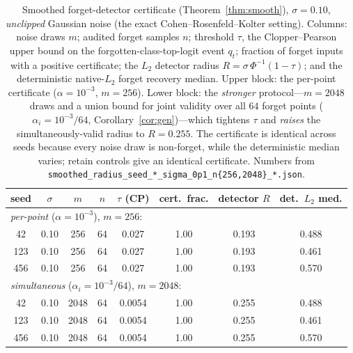 \documentclass[11pt]{article}
\begin{document}
\begin{table}[t]
  \centering
  \small
  \setlength{\tabcolsep}{5pt}
  \begin{tabular}{c c c c c c c c}
    \toprule
    seed & $\sigma$ & $m$ & $n$ & $\tau$ (CP) & cert.\ frac. & detector $R$ & det.\ $L_2$ med. \\
    \midrule
    \multicolumn{8}{l}{\emph{per-point} ($\alpha = 10^{-3}$), $m=256$:} \\
    42  & 0.10 & 256 & 64 & 0.027 & 1.00 & 0.193 & 0.488 \\
    123 & 0.10 & 256 & 64 & 0.027 & 1.00 & 0.193 & 0.461 \\
    456 & 0.10 & 256 & 64 & 0.027 & 1.00 & 0.193 & 0.570 \\
    \midrule
    \multicolumn{8}{l}{\emph{simultaneous} ($\alpha_i = 10^{-3}/64$), $m=2048$:} \\
    42  & 0.10 & 2048 & 64 & 0.0054 & 1.00 & 0.255 & 0.488 \\
    123 & 0.10 & 2048 & 64 & 0.0054 & 1.00 & 0.255 & 0.461 \\
    456 & 0.10 & 2048 & 64 & 0.0054 & 1.00 & 0.255 & 0.570 \\
    \bottomrule
  \end{tabular}
  \caption{Smoothed forget-detector certificate (Theorem~\ref{thm:smooth}), $\sigma = 0.10$, \emph{unclipped} Gaussian noise (the exact Cohen--Rosenfeld--Kolter setting). Columns: noise draws $m$; audited forget samples $n$; threshold $\tau$, the Clopper--Pearson upper bound on the forgotten-class-top-logit event $q_t$; fraction of forget inputs with a positive certificate; the $L_2$ detector radius $R = \sigma\,\Phi^{-1}(1-\tau)$; and the deterministic native-$L_2$ forget recovery median. Upper block: the per-point certificate ($\alpha=10^{-3}$, $m=256$). Lower block: the \emph{stronger} protocol---$m=2048$ draws and a union bound for joint validity over all $64$ forget points ($\alpha_i=10^{-3}/64$, Corollary~\ref{cor:gen})---which tightens $\tau$ and \emph{raises} the simultaneously-valid radius to $R=0.255$. The certificate is identical across seeds because every noise draw is non-forget, while the deterministic median varies; retain controls give an identical certificate. Numbers from \texttt{smoothed\_radius\_seed\_*\_sigma\_0p1\_n\{256,2048\}\_*.json}.}
  \label{tab:cert}
\end{table}
\end{document}

